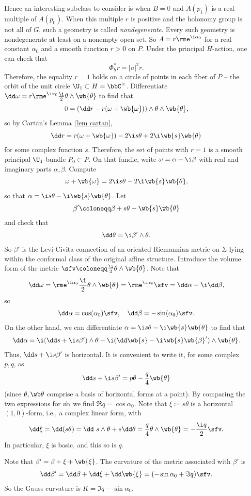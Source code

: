 Hence an interesting subclass to consider is when $B=0$ and $A(p_1)$ is a real multiple of $A(p_0)$. When this multiple $r$ is positive and the holonomy group is not all of $G$, such a geometry is called \emph{nondegenerate}. Every such geometry is nondegenerate at least on a nonempty open set. So $A=r\rme^{\i \alpha_0}$ for a real constant $\alpha_0$ and a smooth function $r>0$ on $P$. Under the principal $H$-action, one can check that 
\[\Phi_h^\ast r=|a|^2 r.\]
Therefore, the equality $r=1$ holds on a circle of points in each fiber of $P$ -- the orbit of the unit circle $\U_1\subset H=\bbC^\times$. Differentiate $\dd\omega=r\rme^{\i\alpha_0}\frac{\i}{2}\theta\wedge\wb{\theta}$ to find that 
\[0=(\dd r-r(\omega+\wb{\omega}))\wedge\theta\wedge\wb{\theta},\]
so by Cartan's Lemma~\ref{lem cartan},
\[\dd r=r(\omega+\wb{\omega})-2\i s\theta+2\i \wb{s}\wb{\theta}\]
for some complex function $s$. Therefore, the set of points with $r=1$ is a smooth principal $\U_1$-bundle $P_0\subset P$. On that fundle, write $\omega=\alpha-\i \beta$ with real and imaginary parts $\alpha,\beta$. Compute 
\[\omega+\wb{\omega}=2\i s\theta-2\i \wb{s}\wb{\theta},\]
so that $\alpha=\i s\theta-\i \wb{s}\wb{\theta}$. Let 
\[\beta'\coloneqq \beta+s\theta+\wb{s}\wb{\theta}\]
and check that 
\[\dd\theta=\i\beta'\wedge\theta.\]
So $\beta'$ is the Levi-Civita connection of an oriented Riemannian metric on $\varSigma$ lying within the conformal class of the original affine structure. Introduce the volume form of the metric $\sfv\coloneqq \frac{\i}{2}\theta\wedge\wb{\theta}$. Note that 
\[\dd\omega=\rme^{\i \alpha_0}\frac{\i}{2}\theta\wedge\wb{\theta}=\rme^{\i\alpha_0}\sfv=\dd\alpha-\i\dd\beta,\]
so 
\[\dd\alpha=\cos(\alpha_0)\sfv,\quad \dd\beta=-\sin(\alpha_0)\sfv.\]
On the other hand, we can differentiate $\alpha=\i s\theta-\i\wb{s}\wb{\theta}$ to find that 
\[\dd\alpha=\i(\dd s+\i s\beta')\wedge\theta-\i(\dd\wb{s}-\i\wb{s}\wb{\beta}')\wedge\wb{\theta}.\]
Thus, $\dd s+\i s\beta'$ is horizontal. It is convenient to write it, for some complex $p,q$, as 
\[\dd s+\i s\beta'=p\theta-\frac{q}{4}\wb{\theta}\]
(since $\theta,\wb\theta$ comprise a basis of horizontal forms at a point). 
By comparing the two expressions for $\dd\alpha$ we find $\Re q=\cos\alpha_0$. Note that $\xi\coloneqq s\theta$ is a horizontal $(1,0)$-form, i.e., a complex linear form, with 
\[\dd\xi=\dd(s\theta)=\dd\ s\wedge\theta+s\dd\theta=\frac{q}{4}\theta\wedge\wb{\theta}=-\frac{\i q}{2}\sfv.\]
In particular, $\xi$ is basic, and this so is $q$. 

Note that $\beta'=\beta+\xi+\wb{\xi}$. The curvature of the metric associated with $\beta'$ is 
\[\dd\beta'=\dd\beta+\dd\xi+\dd\wb{\xi}=(-\sin\alpha_0+\Im q)\sfv.\]
So the Gauss curvature is $K=\Im q-\sin\alpha_0$.  

